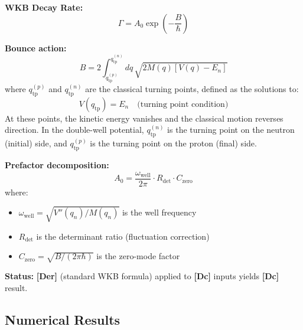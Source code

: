 \documentclass[11pt,a4paper]{article}
\newcommand{\tagDc}{\textcolor{blue!70!black}{\textbf{[Dc]}}}
\newcommand{\tagDer}{\textcolor{green!50!black}{\textbf{[Der]}}}
\begin{document}
\begin{derivbox}
\textbf{WKB Decay Rate:}
\begin{equation}
    \Gamma = A_0 \exp\left( -\frac{B}{\hbar} \right)
    \label{eq:wkb_rate}
\end{equation}

\textbf{Bounce action:}
\begin{equation}
    B = 2 \int_{q_{\text{tp}}^{(p)}}^{q_{\text{tp}}^{(n)}} dq \, \sqrt{2 M(q) \left[ V(q) - E_n \right]}
    \label{eq:bounce_action}
\end{equation}
where $q_{\text{tp}}^{(p)}$ and $q_{\text{tp}}^{(n)}$ are the classical turning points, defined as the solutions to:
\begin{equation}
    V(q_{\text{tp}}) = E_n \quad \text{(turning point condition)}
    \label{eq:turning_point}
\end{equation}
At these points, the kinetic energy vanishes and the classical motion reverses direction. In the double-well potential, $q_{\text{tp}}^{(n)}$ is the turning point on the neutron (initial) side, and $q_{\text{tp}}^{(p)}$ is the turning point on the proton (final) side.

\textbf{Prefactor decomposition:}
\begin{equation}
    A_0 = \frac{\omega_{\text{well}}}{2\pi} \cdot R_{\text{det}} \cdot C_{\text{zero}}
    \label{eq:prefactor}
\end{equation}
where:
\begin{itemize}[nosep]
    \item $\omega_{\text{well}} = \sqrt{V''(q_n) / M(q_n)}$ is the well frequency
    \item $R_{\text{det}}$ is the determinant ratio (fluctuation correction)
    \item $C_{\text{zero}} = \sqrt{B/(2\pi\hbar)}$ is the zero-mode factor
\end{itemize}
\end{derivbox}

\textbf{Status:} \tagDer{} (standard WKB formula) applied to \tagDc{} inputs yields \tagDc{} result.

\subsection{Numerical Results}
\end{document}
